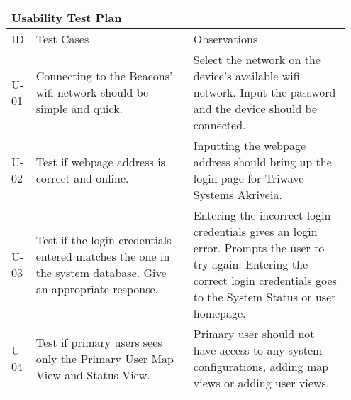 \begin{table}[h!]
    \centering
    \begin{tabular}{|m{0.05\linewidth}|m{0.45\linewidth}|m{0.45\linewidth}|} 
    \hline
    \multicolumn{3}{|l|}{\textbf{Usability Test Plan}}           \\ 
    \hline
    ID    & Test Cases    & Observations     \\ 
    \hline
    
    U-01 
    & Connecting to the Beacons' wifi network should be simple and quick.
    & Select the network on the device's available wifi network. Input the password and the device should be connected.  \\ 
    \hline   
    
    U-02
    & Test if webpage address is correct and online.
    & Inputting the webpage address should bring up the login page for Triwave Systems Akriveia.   \\ 
    \hline
    
    U-03 
    & Test if the login credentials entered matches the one in the system database. Give an appropriate response.
    & Entering the incorrect login credentials gives an login error. Prompts the user to try again.
      Entering the correct login credentials goes to the System Status or user homepage.  \\ 
      
    \hline

    U-04
    & Test if primary users sees only the Primary User Map View and Status View.
    & Primary user should not have access to any system configurations, adding map views or adding user views.   \\ 
    \hline


\end{tabular}
\end{table}

